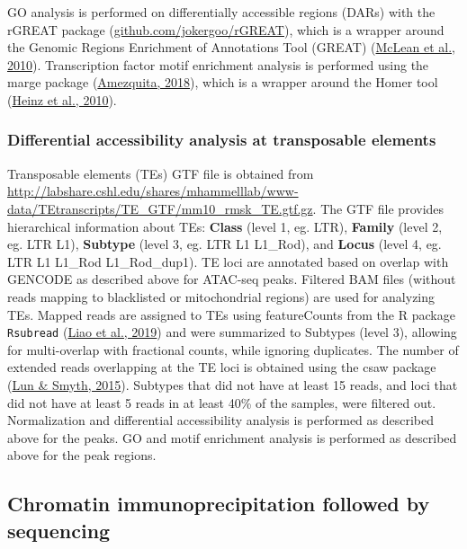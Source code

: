 \documentclass[12pt,twoside]{reedthesis}
\begin{document}
GO analysis is performed on differentially accessible regions (DARs)
with the rGREAT package (\href{https://github.com/jokergoo/rGREAT}{github.com/jokergoo/rGREAT}), which is
a wrapper around the Genomic Regions Enrichment of Annotations Tool
(GREAT) (\protect\hyperlink{ref-mclean2010}{McLean et al., 2010}). Transcription factor motif enrichment analysis is
performed using the marge package (\protect\hyperlink{ref-amezquita2018}{Amezquita, 2018}), which is a wrapper
around the Homer tool (\protect\hyperlink{ref-heinz2010}{Heinz et al., 2010}).

\hypertarget{m3.3.4}{%
\subsubsection*{Differential accessibility analysis at transposable elements}\label{m3.3.4}}

Transposable elements (TEs) GTF file is obtained
from \href{http://labshare.cshl.edu/shares/mhammelllab/www-data/TEtranscripts/TE_GTF/mm10_rmsk_TE.gtf.gz\%20on\%2003.02.2020}{http://labshare.cshl.edu/shares/mhammelllab/www-data/TEtranscripts/TE\_GTF/mm10\_rmsk\_TE.gtf.gz}. The GTF file provides hierarchical information about TEs: \textbf{Class}
(level 1, eg. LTR), \textbf{Family} (level 2, eg. LTR L1), \textbf{Subtype} (level
3, eg. LTR L1 L1\_Rod), and \textbf{Locus} (level 4, eg. LTR L1 L1\_Rod
L1\_Rod\_dup1). TE loci are annotated based on overlap with GENCODE as
described above for ATAC-seq peaks. Filtered BAM files (without reads
mapping to blacklisted or mitochondrial regions) are used for analyzing
TEs. Mapped reads are assigned to TEs using featureCounts from the R
package \texttt{Rsubread} (\protect\hyperlink{ref-liao2019}{Liao et al., 2019}) and were summarized to Subtypes (level 3),
allowing for multi-overlap with fractional counts, while ignoring
duplicates. The number of extended reads overlapping at the TE loci is
obtained using the csaw package (\protect\hyperlink{ref-lun2015}{Lun \& Smyth, 2015}). Subtypes that did not have
at least 15 reads, and loci that did not have at least 5 reads in at
least 40\% of the samples, were filtered out. Normalization and
differential accessibility analysis is performed as described above for
the peaks. GO and motif enrichment analysis is performed as described
above for the peak regions.

\hypertarget{m3.4}{%
\subsection*{Chromatin immunoprecipitation followed by sequencing}\label{m3.4}}
\end{document}
